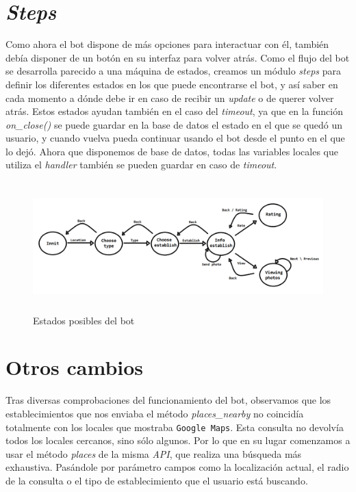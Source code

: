 \documentclass[oneside]{memoir}
\begin{document}
\section{\textit{Steps}}
Como ahora el bot dispone de más opciones para interactuar con él, también debía disponer de un botón en su interfaz para volver atrás. Como el flujo del bot se desarrolla parecido a una máquina de estados, creamos un módulo \textit{steps} para definir los diferentes estados en los que puede encontrarse el bot, y así saber en cada momento a dónde debe ir en caso de recibir un \textit{update} o de querer volver atrás. Estos estados ayudan también en el caso del \textit{timeout}, ya que en la función \textit{on\_close()} se puede guardar en la base de datos el estado en el que se quedó un usuario, y cuando vuelva pueda continuar usando el bot desde el punto en el que lo dejó. Ahora que disponemos de base de datos, todas las variables locales que utiliza el \textit{handler} también se pueden guardar en caso de \textit{timeout}.

\begin{figure}[h!]
  \centering
  \includegraphics[height=50mm]{steps.png}
  \caption{Estados posibles del bot}
  \label{fig:Estados posibles del bot}
\end{figure}

\section{Otros cambios}
Tras diversas comprobaciones del funcionamiento del bot, observamos que los establecimientos que nos enviaba el método \textit{places\_nearby} no coincidía totalmente con los locales que mostraba \texttt{Google Maps}. Esta consulta no devolvía todos los locales cercanos, sino sólo algunos. Por lo que en su lugar comenzamos a usar el método \textit{places} de la misma \textit{API}, que realiza una búsqueda más exhaustiva. Pasándole por parámetro campos como la localización actual, el radio de la consulta o el tipo de establecimiento que el usuario está buscando. 

\end{document}
